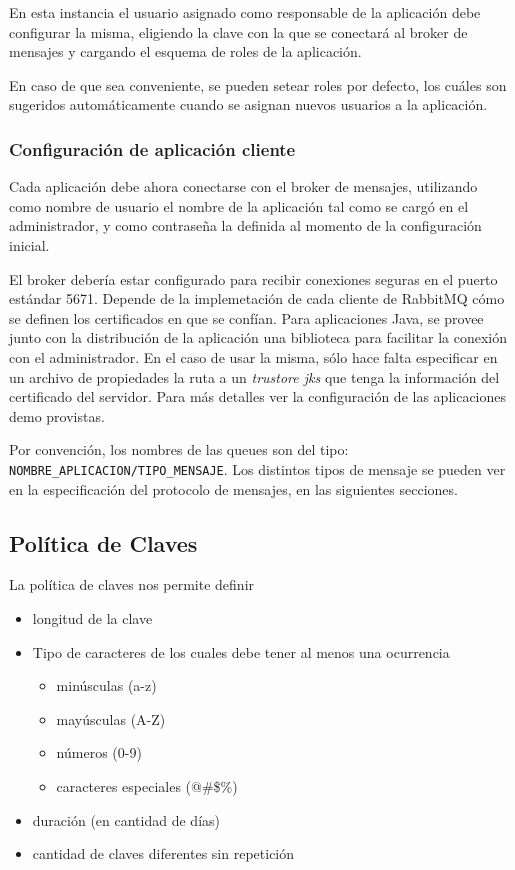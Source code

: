 En esta instancia el usuario asignado como responsable de la aplicación debe configurar la misma, eligiendo la
clave con la que se conectará al broker de mensajes y cargando el esquema de roles de la aplicación.

En caso de que sea conveniente, se pueden setear roles por defecto, los cuáles son sugeridos automáticamente
cuando se asignan nuevos usuarios a la aplicación.

\subsubsection{Configuración de aplicación cliente}
Cada aplicación debe ahora conectarse con el broker de mensajes, utilizando como nombre de usuario el nombre de
la aplicación tal como se cargó en el administrador, y como contraseña la definida al momento de la configuración
inicial.

El broker debería estar configurado para recibir conexiones seguras en el puerto estándar 5671. Depende de la
implemetación de cada cliente de RabbitMQ cómo se definen los certificados en que se confían. Para aplicaciones
Java, se provee junto con la distribución de la aplicación una biblioteca para facilitar la conexión con el
administrador. En el caso de usar la misma, sólo hace falta especificar en un archivo de propiedades la ruta
a un \textit{trustore jks} que tenga la información del certificado del servidor. Para más detalles ver la
configuración de las aplicaciones demo provistas.

Por convención, los nombres de las queues son del tipo: \texttt{NOMBRE\_APLICACION/TIPO\_MENSAJE}. Los distintos
tipos de mensaje se pueden ver en la especificación del protocolo de mensajes, en las siguientes secciones.

\subsection{Política de Claves}
La política de claves nos permite definir

\begin{itemize}
  \item longitud de la clave
  \item Tipo de caracteres de los cuales debe tener al menos una ocurrencia
  \begin{itemize}
    \item minúsculas (a-z)  
    \item mayúsculas (A-Z)
    \item números (0-9)
    \item caracteres especiales (@\#\$\%)
  \end{itemize}
  \item duración (en cantidad de días)
  \item cantidad de claves diferentes sin repetición
\end{itemize}

